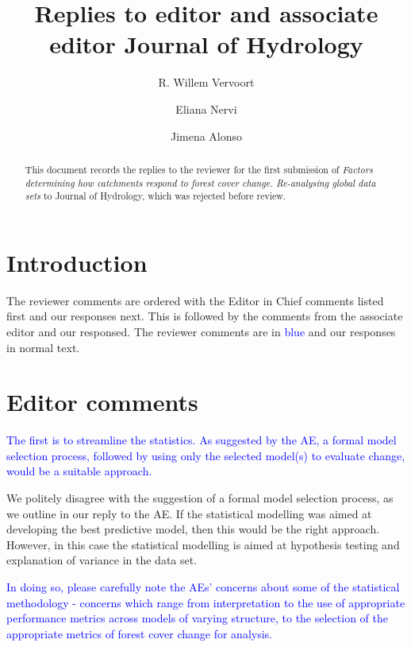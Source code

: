 \documentclass[]{elsarticle} %
\begin{document}
\begin{frontmatter}

  \title{Replies to editor and associate editor Journal of Hydrology}
    \author[]{R. Willem Vervoort}
  
    \author[]{Eliana Nervi}
  
    \author[]{Jimena Alonso}
  
  
  \begin{abstract}
  This document records the replies to the reviewer for the first submission of \emph{Factors determining how catchments respond to forest cover change. Re-analysing global data sets} to Journal of Hydrology, which was rejected before review.
  \end{abstract}
  
 \end{frontmatter}

\hypertarget{introduction}{%
\section{Introduction}\label{introduction}}

The reviewer comments are ordered with the Editor in Chief comments listed first and our responses next. This is followed by the comments from the associate editor and our responsed. The reviewer comments are in \textcolor{blue}{blue} and our responses in normal text.

\hypertarget{editor-comments}{%
\section{Editor comments}\label{editor-comments}}

\textcolor{blue}{The first is to streamline the statistics.  As suggested by the AE, a formal model selection process, followed by using only the selected model(s) to evaluate change, would be a suitable approach.}

We politely disagree with the suggestion of a formal model selection process, as we outline in our reply to the AE. If the statistical modelling was aimed at developing the best predictive model, then this would be the right approach. However, in this case the statistical modelling is aimed at hypothesis testing and explanation of variance in the data set.

\textcolor{blue}{In doing so, please carefully note the AEs' concerns about some of the statistical methodology - concerns which range from interpretation to the use of appropriate performance metrics across models of varying structure, to the selection of the appropriate metrics of forest cover change for analysis.}
\end{document}
